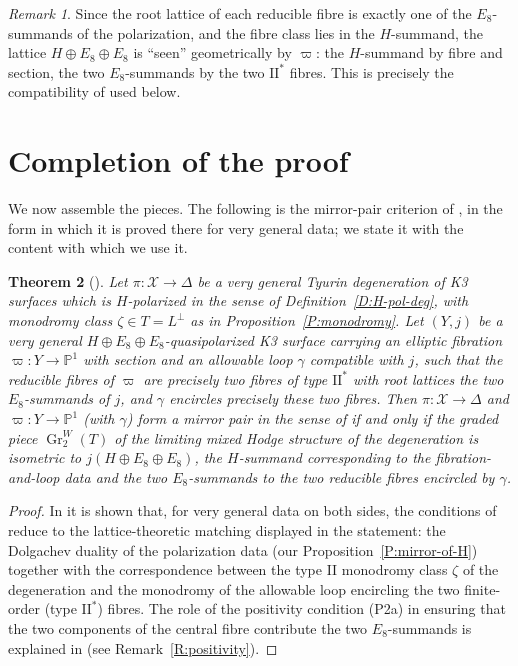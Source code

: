 \documentclass[11pt]{amsart}
\theoremstyle{plain}
\newtheorem{theorem}{Theorem}[section]
\theoremstyle{definition}
\theoremstyle{remark}
\newtheorem{remark}[theorem]{Remark}
\numberwithin{equation}{section}
\begin{document}
\begin{remark}
Since the root lattice of each reducible fibre is exactly one of the
\(E_{8}\)-summands of the polarization, and the fibre class lies in the
\(H\)-summand, the lattice \(H\oplus E_{8}\oplus E_{8}\) is ``seen''
geometrically by \(\varpi\): the \(H\)-summand by fibre and section, the two
\(E_{8}\)-summands by the two \(\mathrm{II}^{*}\) fibres. This is precisely
the compatibility of \cite[Definition 4.21]{dfk3slpms} used below.
\end{remark}

\section{Completion of the proof}\label{S:assembly}

We now assemble the pieces. The following is the mirror-pair criterion of
\cite{dfk3slpms}, in the form in which it is proved there for very general
data; we state it with the content with which we use it.

\begin{theorem}[{\cite[\S 5]{dfk3slpms}}]\label{T:GT-criterion}
Let \(\pi\colon\mathcal X\to\Delta\) be a very general Tyurin degeneration of
K3 surfaces which is \(H\)-polarized in the sense of
Definition~\ref{D:H-pol-deg}, with monodromy class
\(\zeta\in T=L^{\perp}\) as in Proposition~\ref{P:monodromy}. Let
\((Y,j)\) be a very general \(H\oplus E_{8}\oplus E_{8}\)-quasipolarized K3
surface carrying an elliptic fibration \(\varpi\colon Y\to\mathbb P^{1}\) with
section and an allowable loop \(\gamma\) compatible with \(j\), such that the
reducible fibres of \(\varpi\) are precisely two fibres of type
\(\mathrm{II}^{*}\) with root lattices the two \(E_{8}\)-summands of \(j\),
and \(\gamma\) encircles precisely these two fibres. Then
\(\pi\colon\mathcal X\to\Delta\) and
\(\varpi\colon Y\to\mathbb P^{1}\) (with \(\gamma\)) form a mirror pair in
the sense of \cite[Definition 5.1]{dfk3slpms} if and only if the graded piece
\(\operatorname{Gr}^{W}_{2}(T)\) of the limiting mixed Hodge structure of the
degeneration is isometric to
\(j(H\oplus E_{8}\oplus E_{8})\), the \(H\)-summand corresponding to the
fibration-and-loop data and the two \(E_{8}\)-summands to the two reducible
fibres encircled by \(\gamma\).
\end{theorem}

\begin{proof}
In \cite[\S 5]{dfk3slpms} it is shown that, for very general data on both
sides, the conditions of \cite[Definition 5.1]{dfk3slpms} reduce to the
lattice-theoretic matching displayed in the statement: the Dolgachev duality
of the polarization data (our Proposition~\ref{P:mirror-of-H}) together with
the correspondence between the type II monodromy class \(\zeta\) of the
degeneration and the monodromy of the allowable loop encircling the two
finite-order (type \(\mathrm{II}^{*}\)) fibres. The role of the positivity
condition (P2a) in ensuring that the two components of the central fibre
contribute the two \(E_{8}\)-summands is explained in
\cite[\S 3]{dfk3slpms} (see Remark~\ref{R:positivity}).
\end{proof}
\end{document}
